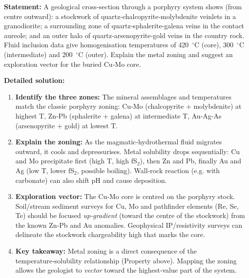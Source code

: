 \documentclass[11pt]{article}
\newcounter{popsec}
\newcounter{popsub}
\newcommand{\courssub}[1]{%
  \stepcounter{popsub}%
  \par\vspace{9pt}\noindent{\popxbold\fontsize{11.5}{13}\selectfont\color{popink}{\color{poporange}\thepopsec.\thepopsub}\hspace{6pt}#1}\par\nopagebreak\vspace{4pt}
}
\begin{document}
\begin{exoresolu}
\textbf{Statement:} A geological cross‑section through a porphyry system shows (from centre outward): a stockwork of quartz‑chalcopyrite‑molybdenite veinlets in a granodiorite; a surrounding zone of quartz‑sphalerite‑galena veins in the contact aureole; and an outer halo of quartz‑arsenopyrite‑gold veins in the country rock.  Fluid inclusion data give homogenisation temperatures of \SI{420}{\ensuremath{{}^{\circ}\mathrm{C}}} (core), \SI{300}{\ensuremath{{}^{\circ}\mathrm{C}}} (intermediate) and \SI{200}{\ensuremath{{}^{\circ}\mathrm{C}}} (outer).  Explain the metal zoning and suggest an exploration vector for the buried Cu‑Mo core.

\textbf{Detailed solution:}
\begin{enumerate}
\item \textbf{Identify the three zones:} The mineral assemblages and temperatures match the classic porphyry zoning: Cu‑Mo (chalcopyrite + molybdenite) at highest T, Zn‑Pb (sphalerite + galena) at intermediate T, Au‑Ag‑As (arsenopyrite + gold) at lowest T.
\item \textbf{Explain the zoning:} As the magmatic‑hydrothermal fluid migrates outward, it cools and depressurises.  Metal solubility drops sequentially: Cu and Mo precipitate first (high T, high fS$_2$), then Zn and Pb, finally Au and Ag (low T, lower fS$_2$, possible boiling).  Wall‑rock reaction (e.g. with carbonate) can also shift pH and cause deposition.
\item \textbf{Exploration vector:} The Cu‑Mo core is centred on the porphyry stock.  Soil/stream sediment surveys for Cu, Mo and pathfinder elements (Re, Se, Te) should be focused \emph{up‑gradient} (toward the centre of the stockwork) from the known Zn‑Pb and Au anomalies.  Geophysical IP/resistivity surveys can delineate the stockwork chargeability high that marks the core.
\item \textbf{Key takeaway:} Metal zoning is a direct consequence of the temperature‑solubility relationship (Property above).  Mapping the zoning allows the geologist to \emph{vector} toward the highest‑value part of the system.
\end{enumerate}
\end{exoresolu}

\courssub{Key Points to Retain}
\end{document}
